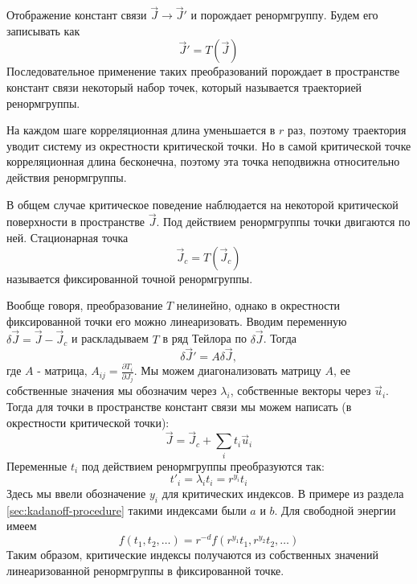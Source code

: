 \documentclass[a4paper,12pt]{article}
\theoremstyle{definition}
\theoremstyle{definition}
\theoremstyle{definition}
\begin{document}
Отображение констант связи $\vec J\to\vec J'$ и порождает ренормгруппу. Будем его записывать как
\begin{equation}
  \label{eq:53}
  \vec J'=T(\vec J)
\end{equation}
Последовательное применение таких преобразований порождает в пространстве констант связи некоторый набор точек, который называется траекторией ренормгруппы.

На каждом шаге корреляционная длина уменьшается в $r$ раз, поэтому траектория уводит систему из окрестности критической точки. Но в самой критической точке корреляционная длина бесконечна, поэтому эта точка неподвижна относительно действия ренормгруппы. 

В общем случае критическое поведение наблюдается на некоторой критической поверхности в пространстве $\vec J$. Под действием ренормгруппы точки двигаются по ней. Стационарная точка
\begin{equation}
  \label{eq:54}
  \vec J_c=T(\vec J_c)
\end{equation}
называется фиксированной точной ренормгруппы.

Вообще говоря, преобразование $T$ нелинейно, однако в окрестности фиксированной точки его можно линеаризовать. Вводим переменную $\delta\vec J=\vec J-\vec J_c$ и раскладываем $T$ в ряд Тейлора по $\delta\vec J$. Тогда
\begin{equation}
  \label{eq:59}
  \delta\vec J'=A\delta\vec J,
\end{equation}
где $A$ - матрица, $A_{ij}=\frac{\partial T_i}{\partial J_j}$. Мы можем диагонализовать матрицу $A$, ее собственные значения мы обозначим через $\lambda_i$, собственные векторы через $\vec u_i$. Тогда для точки в пространстве констант связи мы можем написать (в окрестности  критической точки):
\begin{equation}
  \label{eq:60}
  \vec J=\vec J_c+\sum_i t_i \vec u_i
\end{equation}
Переменные $t_i$ под действием ренормгруппы преобразуются так:
\begin{equation}
  \label{eq:61}
  t'_i=\lambda_i t_i=r^{y_i} t_i
\end{equation}
Здесь мы ввели обозначение $y_i$ для критических индексов. В примере из раздела \ref{sec:kadanoff-procedure} такими индексами были $a$ и $b$. 
Для свободной энергии имеем
\begin{equation}
  \label{eq:62}
  f(t_1,t_2,\dots)=r^{-d} f(r^{y_1}t_1,r^{y_2}t_2,\dots)
\end{equation}
Таким образом, критические индексы получаются из собственных значений линеаризованной ренормгруппы в фиксированной точке.
\end{document}
